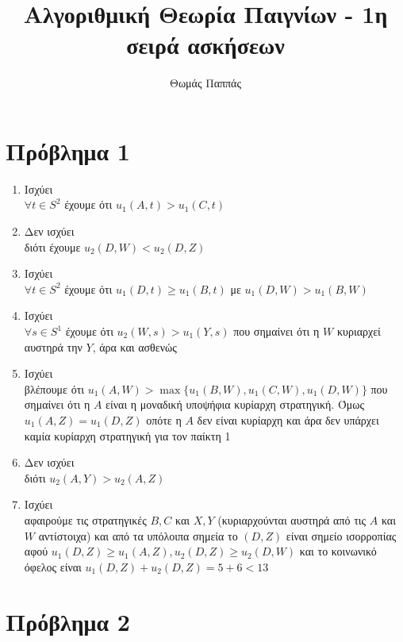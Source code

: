\documentclass[a4paper,11pt]{article}
\begin{document}
\title{Αλγοριθμική Θεωρία Παιγνίων - 1η σειρά ασκήσεων}
\author{Θωμάς Παππάς}
\maketitle

\section*{Πρόβλημα 1}

\begin{enumerate}
	\item Ισχύει\\
	  $\forall t \in S^2$ έχουμε ότι $u_1(A,t)>u_1(C,t)$
	\item Δεν ισχύει\\
	  διότι έχουμε $u_2(D,W) < u_2(D,Z)$
	\item Ισχύει\\
	  $\forall t \in S^2$ έχουμε ότι $u_1(D,t) \geq u_1(B,t)$ με $u_1(D,W)>u_1(B,W)$
	\item Ισχύει\\
	  $\forall s \in S^1$ έχουμε ότι $u_2(W,s)>u_1(Y,s)$ που σημαίνει ότι η $W$ κυριαρχεί αυστηρά την $Y$, άρα και ασθενώς
	\item Ισχύει\\
	  βλέπουμε ότι $u_1(A,W) > \max\{u_1(B,W), u_1(C,W), u_1(D,W)\}$ που σημαίνει ότι η $A$ είναι η μοναδική υποψήφια κυρίαρχη στρατηγική.
	  Όμως $u_1(A,Z) = u_1(D,Z)$ οπότε η $A$ δεν είναι κυρίαρχη και άρα δεν υπάρχει καμία κυρίαρχη στρατηγική για τον παίκτη 1
	\item Δεν ισχύει\\
	  διότι $u_2(A,Y) > u_2(A,Z)$
	\item Ισχύει\\
	  αφαιρούμε τις στρατηγικές $B,C$ και $X,Y$ (κυριαρχούνται αυστηρά από τις $A$ και $W$ αντίστοιχα) και από τα υπόλοιπα σημεία το $(D,Z)$ είναι σημείο ισορροπίας αφού $u_1(D,Z) \geq u_1(A,Z), u_2(D,Z) \geq u_2(D,W)$ και το κοινωνικό όφελος είναι $u_1(D,Z) + u_2(D,Z) = 5+6<13$
\end{enumerate}


\section*{Πρόβλημα 2}
\end{document}
